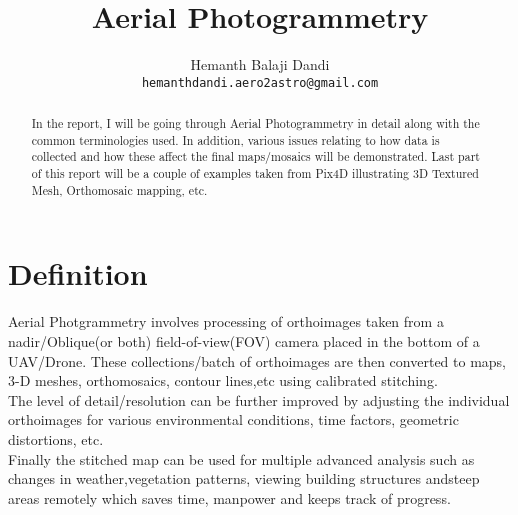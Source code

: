 \documentclass[11pt,twocolumn,letterpaper]{article}
\begin{document}
\title{Aerial Photogrammetry }

\author{Hemanth Balaji Dandi\\
{\tt\small hemanthdandi.aero2astro@gmail.com}
}


\maketitle

\begin{abstract}
In the report, I will be going through Aerial Photogrammetry in detail along with the common terminologies used. In addition, various issues relating to how data is collected and how these affect the final maps/mosaics will be demonstrated. Last part of this report will be a couple of examples taken from Pix4D illustrating 3D Textured Mesh, Orthomosaic mapping, etc.

\end{abstract}

\section{Definition}

Aerial Photgrammetry involves processing of orthoimages taken from a nadir/Oblique(or both) field-of-view(FOV) camera placed in the bottom of a UAV/Drone. These collections/batch of orthoimages are then converted to maps, 3-D meshes, orthomosaics, contour lines,etc using calibrated stitching.
\\ The level of detail/resolution can be further improved by adjusting the individual orthoimages for various environmental conditions, time factors, geometric distortions, etc. 
\\ Finally the stitched map can be used for multiple advanced analysis such as changes in weather,vegetation patterns, viewing building structures andsteep areas remotely which saves time, manpower and keeps track of progress. 
\end{document}
